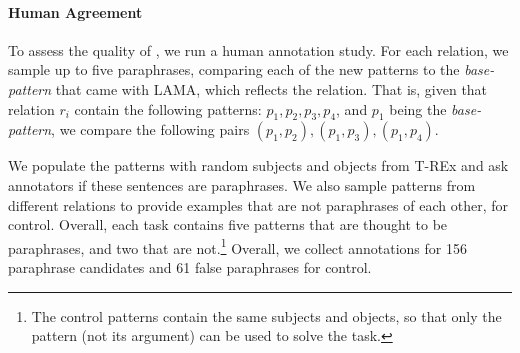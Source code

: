 







\paragraph{Human Agreement}
To assess the quality of \resource{}, we run a
human annotation study.
For each relation, we sample up to
five paraphrases, comparing each of the new patterns to the \textit{base-pattern} that came with LAMA, which reflects the relation.
That is, given that relation $r_i$ contain the following patterns: $p_1, p_2, p_3, p_4$, and $p_1$ being the \textit{base-pattern}, we compare the following pairs $(p_1, p_2), (p_1, p_3), (p_1,p_4)$.


We populate the patterns with random subjects and objects from T-REx \cite{trex} and ask annotators if these sentences are paraphrases.
We also sample patterns from different relations to provide examples that are not paraphrases of each other, for control.
Overall, each task contains five patterns that are thought
to be paraphrases, and two that are not.\footnote{The
  control patterns contain the same subjects and objects, so
  that only the pattern (not its argument) can be used to
  solve the task.}
Overall, we collect annotations for 156 paraphrase candidates and 61 false paraphrases for control.


